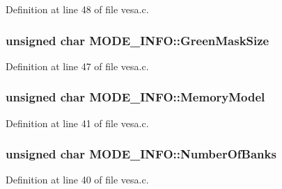 Definition at line 48 of file vesa.\+c.

\subsubsection[{\texorpdfstring{Green\+Mask\+Size}{GreenMaskSize}}]{\setlength{\rightskip}{0pt plus 5cm}unsigned char M\+O\+D\+E\+\_\+\+I\+N\+F\+O\+::\+Green\+Mask\+Size}\hypertarget{structMODE__INFO_a4727bb6ac8a21b55a26cd70afdf07b93}{}\label{structMODE__INFO_a4727bb6ac8a21b55a26cd70afdf07b93}


Definition at line 47 of file vesa.\+c.

\subsubsection[{\texorpdfstring{Memory\+Model}{MemoryModel}}]{\setlength{\rightskip}{0pt plus 5cm}unsigned char M\+O\+D\+E\+\_\+\+I\+N\+F\+O\+::\+Memory\+Model}\hypertarget{structMODE__INFO_a8a72ec6a9d9dcf889d05447372f6b8ed}{}\label{structMODE__INFO_a8a72ec6a9d9dcf889d05447372f6b8ed}


Definition at line 41 of file vesa.\+c.

\subsubsection[{\texorpdfstring{Number\+Of\+Banks}{NumberOfBanks}}]{\setlength{\rightskip}{0pt plus 5cm}unsigned char M\+O\+D\+E\+\_\+\+I\+N\+F\+O\+::\+Number\+Of\+Banks}\hypertarget{structMODE__INFO_af47ccee3ea2d7b618128f3ea97880f86}{}\label{structMODE__INFO_af47ccee3ea2d7b618128f3ea97880f86}


Definition at line 40 of file vesa.\+c.

